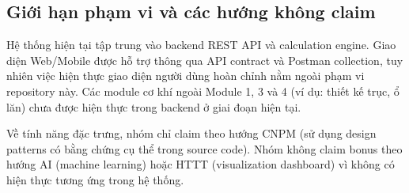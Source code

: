 \documentclass[a4paper]{article}
\begin{document}
\subsection{Giới hạn phạm vi và các hướng không claim}

Hệ thống hiện tại tập trung vào backend REST API và calculation engine. Giao diện Web/Mobile được hỗ trợ thông qua API contract và Postman collection, tuy nhiên việc hiện thực giao diện người dùng hoàn chỉnh nằm ngoài phạm vi repository này. Các module cơ khí ngoài Module 1, 3 và 4 (ví dụ: thiết kế trục, ổ lăn) chưa được hiện thực trong backend ở giai đoạn hiện tại.

Về tính năng đặc trưng, nhóm chỉ claim theo hướng CNPM (sử dụng design patterns có bằng chứng cụ thể trong source code). Nhóm không claim bonus theo hướng AI (machine learning) hoặc HTTT (visualization dashboard) vì không có hiện thực tương ứng trong hệ thống.
\end{document}
